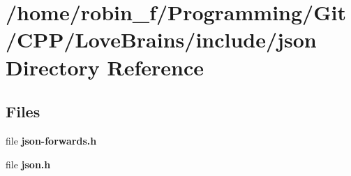\section{/home/robin\+\_\+f/\+Programming/\+Git/\+C\+P\+P/\+Love\+Brains/include/json Directory Reference}
\label{dir_08e35bae3bd8a6b0e5bb440947e43819}
\subsection*{Files}
\begin{DoxyCompactItemize}
\item 
file {\bfseries json-\/forwards.\+h}
\item 
file {\bfseries json.\+h}
\end{DoxyCompactItemize}
